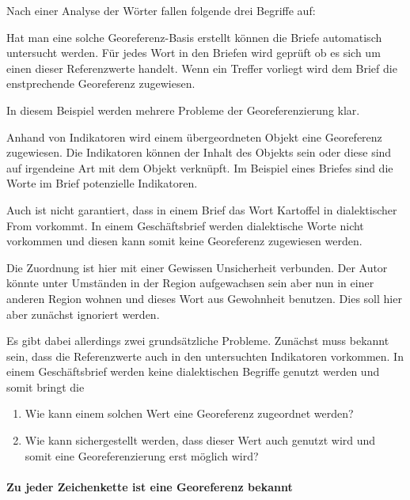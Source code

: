 				Nach einer Analyse der Wörter fallen folgende drei Begriffe auf:

				

				Hat man eine solche Georeferenz-Basis erstellt können die Briefe automatisch untersucht werden.
				Für jedes Wort in den Briefen wird geprüft ob es sich um einen dieser Referenzwerte handelt. 
				Wenn ein Treffer vorliegt wird dem Brief die enstprechende Georeferenz zugewiesen.

				In diesem Beispiel werden mehrere Probleme der Georeferenzierung klar. 

				Anhand von Indikatoren wird einem übergeordneten Objekt eine Georeferenz zugewiesen. 
				Die Indikatoren können der Inhalt des Objekts sein oder diese sind auf irgendeine Art mit dem Objekt verknüpft.
				Im Beispiel eines Briefes sind die Worte im Brief potenzielle Indikatoren.



				Auch ist nicht garantiert, dass in einem Brief das Wort Kartoffel in dialektischer From vorkommt.
				In einem Geschäftsbrief werden dialektische Worte nicht vorkommen und diesen kann somit keine Georeferenz zugewiesen werden.


				Die Zuordnung ist hier mit einer Gewissen Unsicherheit verbunden. 
				Der Autor könnte unter Umständen in der Region aufgewachsen sein aber nun in einer anderen Region wohnen und dieses Wort aus Gewohnheit benutzen.
				Dies soll hier aber zunächst ignoriert werden. 


		
		
		Es gibt dabei allerdings zwei grundsätzliche Probleme.
		Zunächst muss bekannt sein, dass die Referenzwerte auch in den untersuchten Indikatoren vorkommen.
		In einem Geschäftsbrief werden keine dialektischen Begriffe genutzt werden und somit bringt die


		\begin{enumerate}
			\item Wie kann einem solchen Wert eine Georeferenz zugeordnet werden?
			\item Wie kann sichergestellt werden, dass dieser Wert auch genutzt wird und somit eine Georeferenzierung erst möglich wird?
		\end{enumerate}




			\paragraph{Zu jeder Zeichenkette ist eine Georeferenz bekannt}

